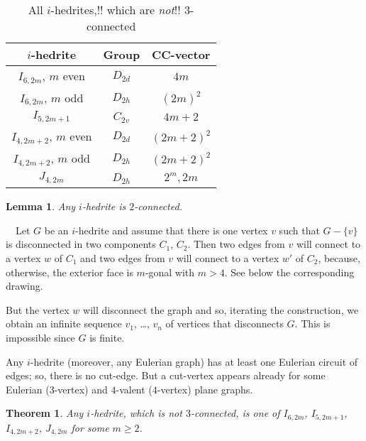 \documentclass[12pt]{article}
\newtheorem{theorem}{Theorem}
\newtheorem{lemma}{Lemma}
\newcommand{\proof}{\noindent{\bf Proof.}\ \ }
\begin{document}
\begin{table}
\centering
\epsfxsize=100mm
\\[2mm]
\begin{tabular}{||c|c|c||}
\hline\hline
$i$-hedrite            &Group      &CC-vector\\\hline\hline
$I_{6,2m}$, $m$ even   &$D_{2d}$   &$4m$\\\hline
$I_{6,2m}$, $m$ odd    &$D_{2h}$   &$(2m)^2$\\\hline
$I_{5,2m+1}$           &$C_{2v}$   &$4m+2$\\\hline
$I_{4,2m+2}$, $m$ even &$D_{2d}$   &$(2m+2)^2$\\\hline
$I_{4,2m+2}$, $m$ odd  &$D_{2h}$   &$(2m+2)^2$\\\hline
$J_{4,2m}$             &$D_{2h}$   &$2^m, 2m$\\\hline\hline
\end{tabular}
\caption{All $i$-hedrites,!! which are {\em not}!! $3$-connected}
\label{FundamentalInfo}
\end{table}



\begin{lemma}
Any $i$-hedrite is $2$-connected.
\end{lemma}
\proof Let $G$ be an $i$-hedrite and assume that there is one vertex $v$ such that $G-\{v\}$ is disconnected in two components $C_1$, $C_2$. Then two edges from $v$ will connect to a vertex $w$ of $C_1$ and two edges from $v$ will connect to a vertex $w'$ of $C_2$, because, otherwise, the exterior face is $m$-gonal with $m>4$. See below the corresponding drawing.

\begin{center}
\epsfxsize=60mm
\end{center}

But the vertex $w$ will disconnect the graph and so, iterating the construction, we obtain an infinite sequence $v_1$, \dots, $v_n$ of vertices that disconnects $G$. 
This is impossible since $G$ is finite.


Any $i$-hedrite (moreover, any Eulerian graph) has at least one 
Eulerian circuit of edges; so, there is no cut-edge.
But a cut-vertex appears already for some Eulerian ($3$-vertex)
and $4$-valent ($4$-vertex) plane graphs.


\begin{theorem}\label{3-connectedness}
Any $i$-hedrite, which is not $3$-connected, is one of $I_{6,2m}$, $I_{5, 2m+1}$, $I_{4, 2m+2}$, $J_{4, 2m}$ for some $m\geq 2$.


\end{theorem}
\end{document}
